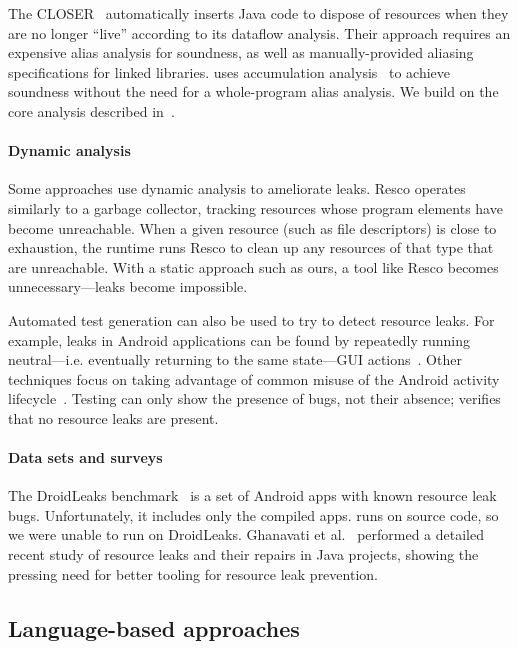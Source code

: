 The CLOSER~\cite{dillig2008closer} automatically inserts Java code to
dispose of resources when they are no longer ``live'' according to its
dataflow analysis.  Their approach requires an expensive alias
analysis for soundness, as well as manually-provided aliasing
specifications for linked libraries. \Tool uses
accumulation analysis~\cite{KelloggRSSE2020,FahndrichLeino03} to
achieve soundness without the need for a whole-program alias analysis.
We build on the core analysis described in~\cite{KelloggRSSE2020}.

\paragraph{Dynamic analysis}
Some approaches use dynamic analysis to ameliorate leaks.  Resco \cite{dai2013resco}
operates similarly to a garbage collector, tracking resources whose program
elements have become unreachable. When a given resource (such as file
descriptors) is close to exhaustion, the runtime runs Resco to clean up any
resources of that type that are unreachable.  With a static approach such as
ours, a tool like Resco becomes unnecessary---leaks become impossible.

Automated test generation can also be used to try to detect resource
leaks. For example, leaks in Android applications can be found by
repeatedly running neutral---i.e. eventually returning to the same
state---GUI actions~\cite{wu2018sentinel,zhang2016automated}.
Other techniques focus on taking advantage of common misuse of
the Android activity lifecycle~\cite{amalfitano2020memories}.
Testing can only show the presence of bugs, not their absence;
\Tool verifies that no resource leaks are present.

\paragraph{Data sets and surveys}
The DroidLeaks
benchmark~\cite{liu2019droidleaks} is a set of Android apps with known resource
leak bugs. Unfortunately, it includes only the compiled apps. \Tool runs on
source code, so we were unable to run \Tool on DroidLeaks. Ghanavati et
al.~\cite{ghanavati2020memory} performed a detailed recent study of resource
leaks and their repairs in Java projects, showing the pressing need for better
tooling for resource leak prevention.

\subsection{Language-based approaches}\label{sec:rw-language}

